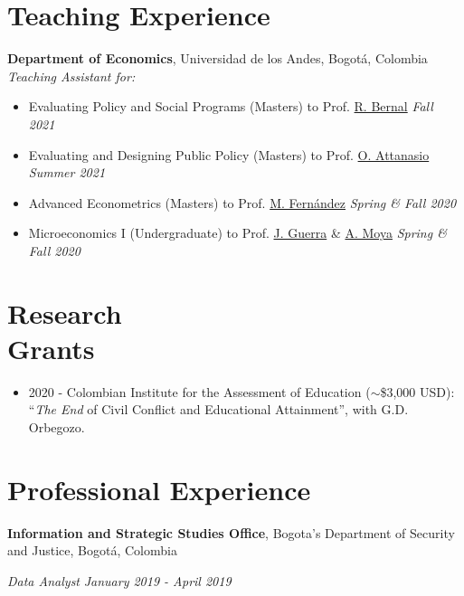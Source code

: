 \documentclass[margin,line]{res}
\begin{document}
\begin{resume}
\vspace{.1cm}

\section{\sc Teaching Experience}

{\bf Department of Economics}, Universidad de los Andes, Bogotá, Colombia \\
{\em Teaching Assistant for:} \\
\vspace{-.3cm}
\begin{itemize}
    \item Evaluating Policy and Social Programs (Masters) to Prof. \href{https://sites.google.com/view/raquelbernal/home}{R. Bernal}  \hfill \emph{Fall 2021}
    \item Evaluating and Designing Public Policy (Masters) to Prof. \href{http://www.orazioattanasio.org/}{O. Attanasio}  \hfill \emph{Summer 2021}
    \item Advanced Econometrics (Masters) to Prof. \href{https://sites.google.com/view/manuelfernandezsierra}{M. Fernández} \hfill \emph{Spring  \& Fall 2020}
    \item Microeconomics I (Undergraduate) to Prof. \href{https://jguerraforero.wixsite.com/joseaguerra}{J. Guerra} \& \href{https://sites.google.com/view/andresmoya}{A. Moya} \hfill \emph{Spring \& Fall 2020}

\end{itemize}



\section{\sc Research \\ Grants} 
\begin{itemize}
    \item 2020 - Colombian Institute for the Assessment of Education ($\sim$\$3,000 USD): ``\textit{The End} of Civil Conflict and Educational Attainment'', with G.D. Orbegozo.
\end{itemize}

\section{\sc Professional Experience}
{\bf Information and Strategic Studies Office}, Bogota's Department of Security and Justice, Bogotá, Colombia

\vspace{-.3cm}
{\em Data Analyst} \hfill \emph{January 2019 - April 2019}\\


\end{resume}
\end{document}
